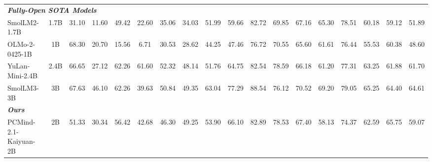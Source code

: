 \begin{tabular}{lccccccccccccccccc}
\midrule

\multicolumn{18}{l}{\textit{\textbf{Fully-Open SOTA Models}}} \\
\rowcolor{fullyopen} SmolLM2-1.7B       & 1.7B & 31.10 & 11.60 & 49.42 & 22.60 & 35.06 & 34.03 & 51.99 & 59.66 & 82.72 & 69.85 & 67.16 & 65.30 & 78.51 & 60.18 & 59.12 & 51.89 \\
\rowcolor{fullyopen} OLMo-2-0425-1B     & 1B   & 68.30 & 20.70 & 15.56 & 6.71 & 30.53 & 28.62 & 44.25 & 47.46 & 76.72 & 70.55 & 65.60 & 61.61 & 76.44 & 55.53 & 60.38 & 48.60 \\
\rowcolor{fullyopen} YuLan-Mini-2.4B    & 2.4B & 66.65 & 27.12 & 62.26 & 61.60 & 52.32 & 48.14 & 51.76 & 64.75 & 82.54 & 78.59 & 66.18 & 61.20 & 77.31 & 63.25 & 61.88 & 61.70 \\
\rowcolor{fullyopen} SmolLM3-3B         & 3B   & 67.63 & 46.10 & 62.26 & 39.63 & 50.84 & 49.35 & 63.04 & 77.29 & 88.54 & 76.12 & 70.52 & 69.20 & 79.05 & 65.25 & 64.40 & 64.61 \\

\midrule

\multicolumn{18}{l}{\textit{\textbf{Ours}}} \\
\rowcolor{ours} PCMind-2.1-Kaiyuan-2B & 2B & 51.33 & 30.34 & 56.42 & 42.68 & 46.30 & 49.25 & 53.90 & 66.10 & 82.89 & 78.53 & 67.40 & 58.13 & 74.37 & 62.59 & 65.75 & 59.07 \\

\bottomrule
\end{tabular}%
